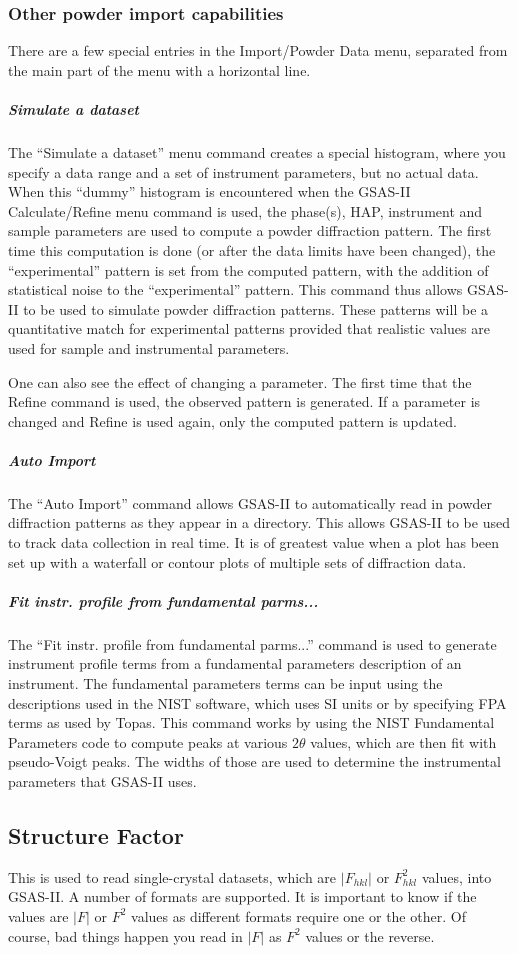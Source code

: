 \subsubsection{Other powder import capabilities}
There are a few special entries in the Import/Powder Data menu, separated from the main part of the menu with a horizontal line. 
\subparagraph{Simulate a dataset}
The ``Simulate a dataset'' menu command creates a special histogram, where you specify a data range and a set of instrument parameters, but no actual data. When this ``dummy'' histogram is encountered when the GSAS-II Calculate/Refine menu command is used, the phase(s), HAP, instrument and sample parameters are used to compute a powder diffraction pattern. The first time this computation is done (or after the data limits have been changed), the ``experimental'' pattern is set from the computed pattern, with the addition of statistical noise to the ``experimental'' pattern. This command thus allows GSAS-II to be used to simulate powder diffraction patterns. These patterns will be a quantitative match for experimental patterns provided that realistic values are used for sample and instrumental parameters. 

One can also see the effect of changing a parameter. The first time that the Refine command is used, the observed pattern is generated. If a parameter is changed and Refine is used again, only the computed pattern is updated. 

\subparagraph{Auto Import}
The ``Auto Import'' command allows GSAS-II to automatically read in powder diffraction patterns as they appear in a directory. This allows GSAS-II to be used to track data collection in real time. It is of greatest value when a plot has been set up with a waterfall or contour plots of multiple sets of diffraction data. 

\subparagraph{Fit instr. profile from fundamental parms...}
The ``Fit instr. profile from fundamental parms...'' command is used to generate instrument profile terms from a fundamental parameters description of an instrument. The fundamental parameters terms can be input using the descriptions used in the NIST software, which uses SI units or by specifying FPA terms as used by Topas. This command works by using the NIST Fundamental Parameters code to compute peaks at various $2\theta$ values, which are then fit with pseudo-Voigt peaks. The widths of those are used to determine the instrumental parameters that GSAS-II uses. 

\subsection{Structure Factor}
This is used to read single-crystal datasets, which are $|F_{hkl}|$ or  $F_{hkl}^2$ values, into GSAS-II. A number of formats are supported. It is important to know if the values are $|F|$ or $F^2$ values as different formats require one or the other. Of course, bad things happen you read in $|F|$ as $F^2$ values or the reverse. 

